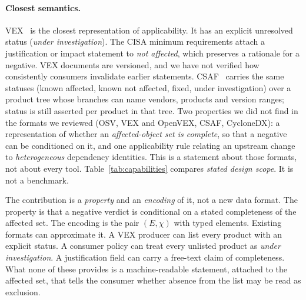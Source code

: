 \documentclass[11pt,a4paper]{article}
\begin{document}
\paragraph{Closest semantics.} VEX~\cite{cisa2023vex,openvex} is the
closest representation of applicability. It has an explicit
unresolved status (\emph{under investigation}). The CISA minimum
requirements attach a justification or impact statement to \emph{not
affected}, which preserves a rationale for a negative. VEX documents
are versioned, and we have not verified how consistently consumers
invalidate earlier statements. CSAF~\cite{oasis2022csaf} carries the
same statuses (known affected, known not affected, fixed, under
investigation) over a product tree whose branches can name vendors,
products and version ranges; status is still asserted per product in
that tree. Two properties we did not find in the
formats we reviewed (OSV, VEX and OpenVEX, CSAF, CycloneDX): a
representation of whether an \emph{affected-object set is complete},
so that a negative can be conditioned on it, and one applicability rule
relating an upstream change to \emph{heterogeneous} dependency
identities. This is a statement about those formats, not about every
tool. Table~\ref{tab:capabilities} compares \emph{stated design
scope}. It is not a benchmark.

The contribution is a \emph{property} and an \emph{encoding} of it,
not a new data format. The property is that a negative verdict is
conditional on a stated completeness of the affected set. The encoding
is the pair $(E, \chi)$ with typed elements. Existing formats can
approximate it. A VEX producer can list every product with an explicit
status. A consumer policy can treat every unlisted product as
\emph{under investigation}. A justification field can carry a
free-text claim of completeness. What none of these provides is a
machine-readable statement, attached to the affected set, that tells
the consumer whether absence from the list may be read as exclusion.
\end{document}
